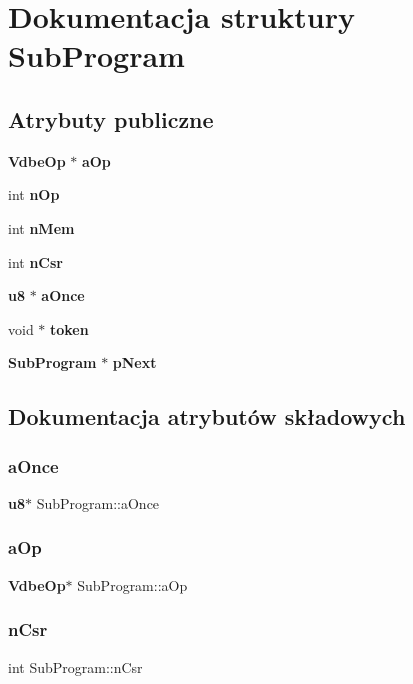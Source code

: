 \section{Dokumentacja struktury Sub\+Program}
\label{struct_sub_program}
\subsection*{Atrybuty publiczne}
\begin{DoxyCompactItemize}
\item 
\textbf{ Vdbe\+Op} $\ast$ \textbf{ a\+Op}
\item 
int \textbf{ n\+Op}
\item 
int \textbf{ n\+Mem}
\item 
int \textbf{ n\+Csr}
\item 
\textbf{ u8} $\ast$ \textbf{ a\+Once}
\item 
void $\ast$ \textbf{ token}
\item 
\textbf{ Sub\+Program} $\ast$ \textbf{ p\+Next}
\end{DoxyCompactItemize}


\subsection{Dokumentacja atrybutów składowych}
\mbox{\label{struct_sub_program_a08810bb6a2a18d1a92e064f5269a6790}} 
\subsubsection{aOnce}
{\footnotesize\ttfamily \textbf{ u8}$\ast$ Sub\+Program\+::a\+Once}

\mbox{\label{struct_sub_program_aa9bb1992fed633d182076a35d6448c7d}} 
\subsubsection{aOp}
{\footnotesize\ttfamily \textbf{ Vdbe\+Op}$\ast$ Sub\+Program\+::a\+Op}

\mbox{\label{struct_sub_program_a83b18aa5cc63aecdbf996c16af1e48bb}} 
\subsubsection{nCsr}
{\footnotesize\ttfamily int Sub\+Program\+::n\+Csr}

